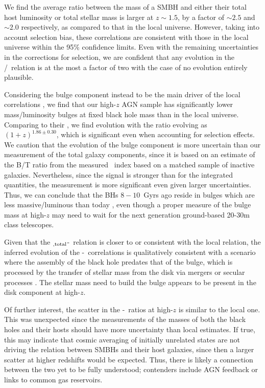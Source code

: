 \documentclass[apj]{emulateapj}
\begin{document}
We find the average ratio between the mass of a SMBH and either their total host luminosity or total stellar mass is larger at $z\sim1.5$, by a factor of $\sim2.5$ and $\sim2.0$ respectively, as compared to that in the local universe. However, taking into account selection bias, these correlations are consistent with those in the local universe within the 95\% confidence limits. 
Even with the remaining uncertainties in the corrections for selection, we are confident that any evolution in the \mbh/\smass\ relation is at the most a factor of two with the case of no evolution entirely plausible.

Considering the bulge component instead to be the main driver of the local correlations \citep{Bennert11, Woo++08}, we find that our high-$z$ AGN sample has significantly lower mass/luminosity bulges at fixed black hole mass than in the local universe. Comparing to their \mbh, we find evolution with the ratio evolving as $(1+z)^{1.86\pm0.30}$, which is significant even when accounting for selection effects. We caution that the evolution of the bulge component is more uncertain than our measurement of the total galaxy components, since it is based on an estimate of the B/T ratio from the measured \sersic\ index based on a matched sample of inactive galaxies. Nevertheless, since the signal is stronger than for the integrated quantities, the measurement is more significant even given larger uncertainties.
Thus, we can conclude that the BHs $8-10$~Gyrs ago reside in bulges which are less massive/luminous than today \citep[see also][]{Bennert11,Park15}, even though a proper measure of the bulge mass at high-$z$ may need to wait for the next generation ground-based 20-30m class telescopes. 

Given that the \smass$_{\rm ,total}$-\mbh\ relation is closer to or consistent with the local relation, the inferred evolution of the \bmass-\mbh\ correlations is qualitatively consistent with a scenario where the assembly of the black hole predates that of the bulge, which is processed by the transfer of stellar mass from the disk via mergers or secular processes \citep{Croton2006}. The stellar mass need to build the bulge appears to be present in the disk component at high-$z$.

Of further interest, the scatter in the \mbh-\smass\ ratios at high-$z$ is similar to the local one. This was unexpected since the measurements of the masses of both the black holes and their hosts should have more uncertainty than local estimates. If true, this may indicate that cosmic averaging of initially unrelated states \citep{Peng2007} are not driving the relation between SMBHs and their host galaxies, since then a larger scatter at higher redshifts would be expected. Thus, there is likely a connection between the two yet to be fully understood; contenders include AGN feedback or links to common gas reservoirs.
\end{document}

